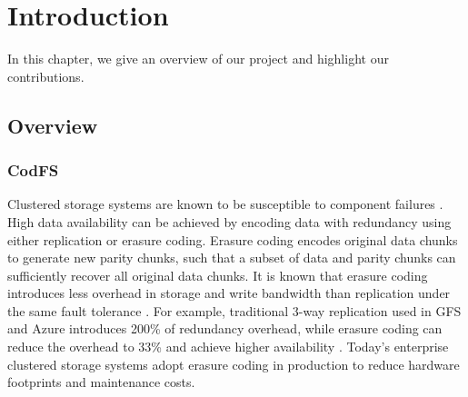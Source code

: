 \chapter{Introduction}
\label{sec:introduction}

In this chapter, we give an overview of our project and highlight our
contributions.

\section{Overview}

\subsection{CodFS}

Clustered storage systems are known to be susceptible to component failures
\cite{ghemawat03}.  High data availability can be achieved by encoding data
with redundancy using either replication or erasure coding.  Erasure coding
encodes original data chunks to generate new parity chunks, such that a subset
of data and parity chunks can sufficiently recover all original data chunks.
It is known that erasure coding introduces less overhead in storage and write
bandwidth than replication under the same fault tolerance
\cite{weatherspoon02,rodrigues05}.  For example, traditional 3-way replication
used in GFS \cite{ghemawat03} and Azure \cite{calder11} introduces 200\% of
redundancy overhead, while erasure coding can reduce the overhead to 33\%
and achieve higher availability \cite{huang12}.  Today's enterprise
clustered storage systems
\cite{welch08,ford10,huang12,sathiamoorthy13,resch11} adopt erasure coding in
production to reduce hardware footprints and maintenance costs.

